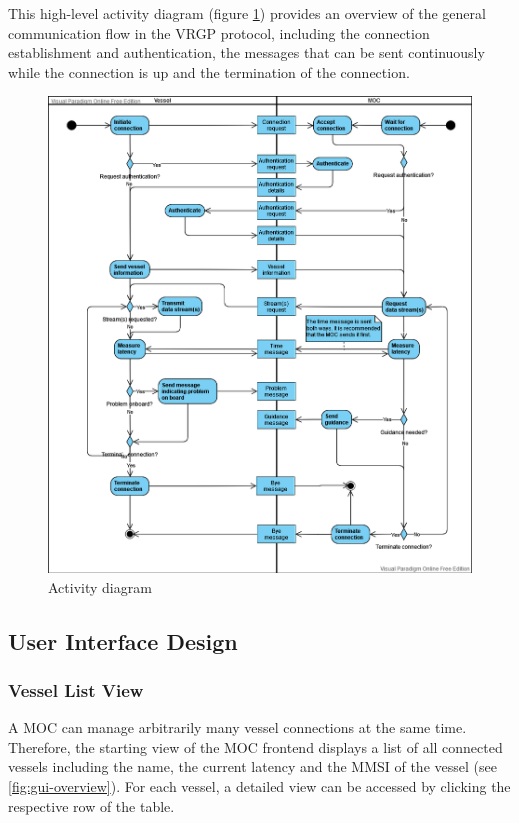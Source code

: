 This high-level activity diagram (figure \ref{fig:activity-diagram}) provides an overview of the general communication flow in the VRGP protocol, including the connection establishment and authentication, the messages that can be sent continuously while the connection is up and the termination of the connection.

\begin{figure}[ht]
	\centering
	\includegraphics[width=\linewidth]{diagrams/activity-diagram}
	\caption{Activity diagram}
	\label{fig:activity-diagram}
\end{figure}

\subsection{User Interface Design}\label{sec:ui-design}

\subsubsection{Vessel List View}

A MOC can manage arbitrarily many vessel connections at the same time. Therefore, the starting view of the MOC frontend displays a list of all connected vessels including the name, the current latency and the MMSI of the vessel (see \ref{fig:gui-overview}). For each vessel, a detailed view can be accessed by clicking the respective row of the table.

